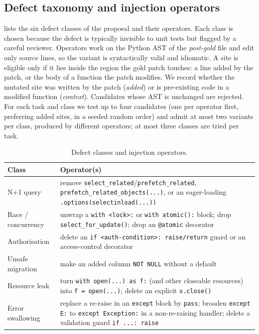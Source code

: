 \subsection{Defect taxonomy and injection operators}
 lists the six defect classes of the proposal and their
operators.  Each class is chosen because the defect is typically invisible to
unit tests but flagged by a careful reviewer.  Operators work on the Python AST
of the \emph{post-gold} file and edit only source lines, so the variant is
syntactically valid and idiomatic.  A site is eligible only if it lies inside
the region the gold patch touches: a line added by the patch, or the body of a
function the patch modifies.  We record whether the mutated site was written by
the patch (\emph{added}) or is pre-existing code in a modified function
(\emph{context}).  Candidates whose AST is unchanged are rejected.  For each
task and class we test up to four candidates (one per operator first, preferring
added sites, in a seeded random order) and admit at most two variants per class,
produced by different operators; at most three classes are tried per task.

\begin{table}[t]
\caption{Defect classes and injection operators.}
\label{tab:operators}
\centering
\footnotesize
\begin{tabular}{@{}>{\raggedright\arraybackslash}p{}>{\raggedright\arraybackslash}p{}@{}}
\toprule
Class & Operator(s) \\
\midrule
N+1 query & remove \texttt{select\_related}/\texttt{prefetch\_related}, \texttt{prefetch\_related\_objects(...)}, or an eager-loading \texttt{.options(selectinload(...))} \\
Race / concurrency & unwrap a \texttt{with <lock>:} or \texttt{with atomic():} block; drop \texttt{select\_for\_update()}; drop an \texttt{@atomic} decorator \\
Authorisation & delete an \texttt{if <auth-condition>: raise/return} guard or an access-control decorator \\
Unsafe migration & make an added column \texttt{NOT NULL} without a default \\
Resource leak & turn \texttt{with open(...) as f:} (and other closeable resources) into \texttt{f = open(...)}; delete an explicit \texttt{x.close()} \\
Error swallowing & replace a re-raise in an \texttt{except} block by \texttt{pass}; broaden \texttt{except E:} to \texttt{except Exception:} in a non-re-raising handler; delete a validation guard \texttt{if ...: raise} \\
\bottomrule
\end{tabular}
\end{table}

